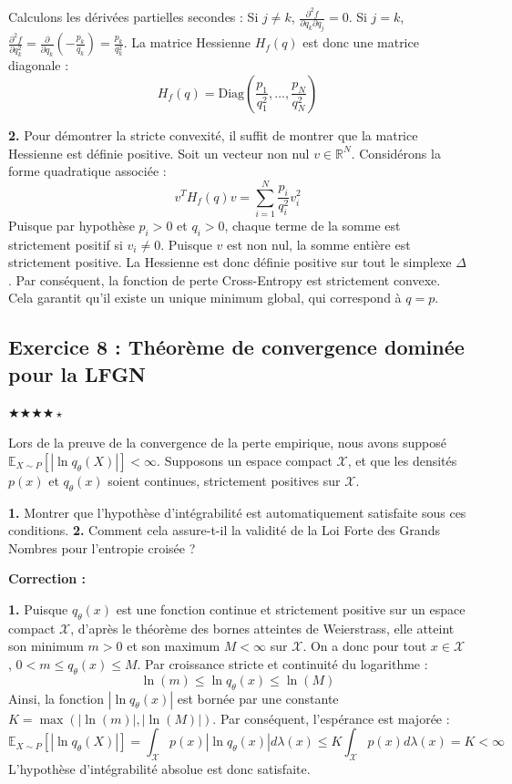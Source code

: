 \documentclass[11pt,a4paper]{article}
\begin{document}
Calculons les dérivées partielles secondes :
Si $j \neq k$, $\frac{\partial^2 f}{\partial q_k \partial q_j} = 0$.
Si $j = k$, $\frac{\partial^2 f}{\partial q_k^2} = \frac{\partial}{\partial q_k} \left(- \frac{p_k}{q_k} \right) = \frac{p_k}{q_k^2}$.
La matrice Hessienne $H_f(q)$ est donc une matrice diagonale :
$$H_f(q) = \text{Diag} \left( \frac{p_1}{q_1^2}, \dots, \frac{p_N}{q_N^2} \right)$$

\textbf{2.} Pour démontrer la stricte convexité, il suffit de montrer que la matrice Hessienne est définie positive.
Soit un vecteur non nul $v \in \mathbb{R}^N$. Considérons la forme quadratique associée :
$$v^T H_f(q) v = \sum_{i=1}^N \frac{p_i}{q_i^2} v_i^2$$
Puisque par hypothèse $p_i > 0$ et $q_i > 0$, chaque terme de la somme est strictement positif si $v_i \neq 0$. Puisque $v$ est non nul, la somme entière est strictement positive.
La Hessienne est donc définie positive sur tout le simplexe $\Delta$. Par conséquent, la fonction de perte Cross-Entropy est strictement convexe. Cela garantit qu'il existe un unique minimum global, qui correspond à $q = p$.


\subsection*{Exercice 8 : Théorème de convergence dominée pour la LFGN }

$\bigstar\bigstar\bigstar\bigstar\star$


Lors de la preuve de la convergence de la perte empirique, nous avons supposé $\mathbb{E}_{X \sim P}[|\ln q_\theta(X)|] < \infty$.
Supposons un espace compact $\mathcal{X}$, et que les densités $p(x)$ et $q_\theta(x)$ soient continues, strictement positives sur $\mathcal{X}$.

\textbf{1.} Montrer que l'hypothèse d'intégrabilité est automatiquement satisfaite sous ces conditions.
\textbf{2.} Comment cela assure-t-il la validité de la Loi Forte des Grands Nombres pour l'entropie croisée ?

\textbf{Correction :}

\textbf{1.} Puisque $q_\theta(x)$ est une fonction continue et strictement positive sur un espace compact $\mathcal{X}$, d'après le théorème des bornes atteintes de Weierstrass, elle atteint son minimum $m > 0$ et son maximum $M < \infty$ sur $\mathcal{X}$.
On a donc pour tout $x \in \mathcal{X}$, $0 < m \le q_\theta(x) \le M$.
Par croissance stricte et continuité du logarithme :
$$ \ln(m) \le \ln q_\theta(x) \le \ln(M) $$
Ainsi, la fonction $|\ln q_\theta(x)|$ est bornée par une constante $K = \max(|\ln(m)|, |\ln(M)|)$.
Par conséquent, l'espérance est majorée :
$$\mathbb{E}_{X \sim P}[|\ln q_\theta(X)|] = \int_{\mathcal{X}} p(x) |\ln q_\theta(x)| d\lambda(x) \le K \int_{\mathcal{X}} p(x) d\lambda(x) = K < \infty$$
L'hypothèse d'intégrabilité absolue est donc satisfaite.
\end{document}
